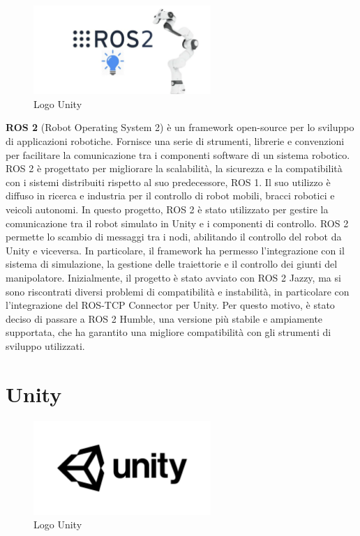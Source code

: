 \documentclass[11pt]{report}
\begin{document}
\begin{figure}[h!]
    \centering
    \includegraphics[width=0.6\textwidth]{images/ROS2.png}
    \caption{Logo Unity}
    \label{fig:UNITY}
\end{figure}

\textbf{ROS 2} (Robot Operating System 2) è un framework open-source per lo sviluppo di applicazioni robotiche. Fornisce una serie di strumenti, librerie e convenzioni per facilitare la comunicazione tra i componenti software di un sistema robotico. ROS 2 è progettato per migliorare la scalabilità, la sicurezza e la compatibilità con i sistemi distribuiti rispetto al suo predecessore, ROS 1. Il suo utilizzo è diffuso in ricerca e industria per il controllo di robot mobili, bracci robotici e veicoli autonomi.
In questo progetto, ROS 2 è stato utilizzato per gestire la comunicazione tra il robot simulato in Unity e i componenti di controllo. ROS 2 permette lo scambio di messaggi tra i nodi, abilitando il controllo del robot da Unity e viceversa. In particolare, il framework ha permesso l'integrazione con il sistema di simulazione, la gestione delle traiettorie e il controllo dei giunti del manipolatore.
Inizialmente, il progetto è stato avviato con ROS 2 Jazzy, ma si sono riscontrati diversi problemi di compatibilità e instabilità, in particolare con l'integrazione del ROS-TCP Connector per Unity. Per questo motivo, è stato deciso di passare a ROS 2 Humble, una versione più stabile e ampiamente supportata, che ha garantito una migliore compatibilità con gli strumenti di sviluppo utilizzati.
\section{Unity}

\begin{figure}[h!]
    \centering
    \includegraphics[width=0.6\textwidth]{images/UNITY.jpg}
    \caption{Logo Unity}
    \label{fig:UNITY}
\end{figure}
\end{document}
